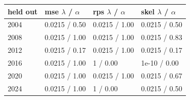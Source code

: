 
\begin{tabular}{llll}
\toprule
held out & mse $\lambda$ / $\alpha$ & rps $\lambda$ / $\alpha$ & skel $\lambda$ / $\alpha$\\
\midrule
2004 & 0.0215 / 0.50 & 0.0215 / 1.00 & 0.0215 / 0.50\\
2008 & 0.0215 / 1.00 & 0.0215 / 1.00 & 0.0215 / 0.83\\
2012 & 0.0215 / 0.17 & 0.0215 / 1.00 & 0.0215 / 0.17\\
2016 & 0.0215 / 1.00 & 1 / 0.00 & 1e-10 / 0.00\\
2020 & 0.0215 / 1.00 & 0.0215 / 1.00 & 0.0215 / 0.67\\
2024 & 0.0215 / 1.00 & 1 / 0.00 & 0.0215 / 0.50\\
\bottomrule
\end{tabular}
